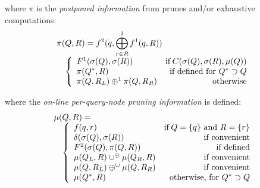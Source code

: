 \documentclass[times, 10pt,twocolumn]{article}
\newcommand{\union}{\cup}
\DeclareMathOperator{\IF}{if}
\newcommand{\muv}{\union^{\oplus}}
\newcommand{\muh}{\oplus^{\union}}
\newcommand{\allsigma}{\sigma}
\begin{document}
\noindent where $\pi$ is the {\it postponed information} from prunes and/or exhaustive computations:
\begin{equation}
\label{eqn:pi}
 \begin{array}{ll}
  \lefteqn{\pi(Q, R) = f^{2}(q, \bigoplus^{1}_{r \in R} f^{1}(q, R))}
  \\
  & \left\{
    \begin{array}{lr}
      F^{1}(\allsigma(Q), \allsigma(R)) & \IF C(\allsigma(Q), \allsigma(R), \mu(Q))
      \\
      \pi(Q^{*}, R) & \mbox{if defined for } Q^{*} \supset Q
      \\
      \pi(Q, R_L) \oplus^{1} \pi(Q, R_R) & \mbox{otherwise}
    \end{array}
  \right.
 \end{array}
\end{equation}

\noindent where the {\it on-line per-query-node pruning information} is defined:
\begin{equation}
\label{eqn:mu}
 \begin{array}{ll}
  \lefteqn{\mu(Q, R) =}
  \\
  & \left\{
    \begin{array}{lr}
      f(q, r) & \IF Q = \{q\} \mbox{ and } R = \{r\}
      \\
      \delta(\allsigma(Q), \allsigma(R)) & \mbox{if convenient}
      \\
      F^2(\allsigma(Q), \pi(Q, R)) & \mbox{if defined}
      \\
      \mu(Q_L, R) \muv \mu(Q_R, R) & \mbox{if convenient}
      \\
      \mu(Q, R_L) \muh \mu(Q, R_R) & \mbox{if convenient}
      \\
      \mu(Q^{*}, R) & \mbox{otherwise, for } Q^{*} \supset Q
    \end{array}
  \right.
 \end{array}
\end{equation}
\end{document}
